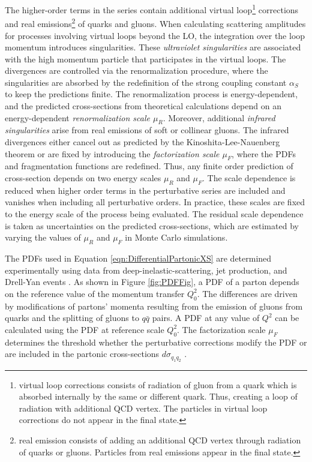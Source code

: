 The higher-order terms in the series contain additional virtual loop\footnote{virtual loop corrections consists of radiation of gluon from a quark which is absorbed internally by the same or different quark. Thus, creating a loop of radiation with additional QCD vertex. The particles in virtual loop corrections do not appear in the final state.} corrections and real emissions\footnote{real emission consists of adding an additional QCD vertex through radiation of quarks or gluons. Particles from real emissions appear in the final state.} of quarks and gluons. When calculating scattering amplitudes for processes involving virtual loops beyond the LO, the integration over the loop momentum introduces singularities. These \textit{ultraviolet singularities} are associated with the high momentum particle that participates in the virtual loops. The divergences are controlled via the renormalization procedure, where the singularities are absorbed by the redefinition of the strong coupling constant $\alpha_S$ to keep the predictions finite. The renormalization process is energy-dependent, and the predicted cross-sections from theoretical calculations depend on an energy-dependent \textit{renormalization scale $\mu_{R}$}. Moreover, additional \textit{infrared singularities} arise from real emissions of soft or collinear gluons. The infrared divergences either cancel out as predicted by the Kinoshita-Lee-Nauenberg theorem \cite{SoftCollinear} or are fixed by introducing the \textit{factorization scale $\mu_{F}$}, where the PDFs and fragmentation functions are redefined. Thus, any finite order prediction of cross-section depends on two energy scales $\mu_{R}$ and $\mu_{F}$. The scale dependence is reduced when higher order terms in the perturbative series are included and vanishes when including all perturbative orders. In practice, these scales are fixed to the energy scale of the process being evaluated. The residual scale dependence is taken as uncertainties on the predicted cross-sections, which are estimated by varying the values of $\mu_{R}$ and $\mu_{F}$ in Monte Carlo simulations.

The PDFs used in Equation \ref{eqn:DifferentialPartonicXS} are determined experimentally using data from deep-inelastic-scattering, jet production, and Drell-Yan events \cite{FixedTargetDrellYan} \cite{PDF4LHC}. As shown in Figure \ref{fig:PDFFig}, a PDF of a parton depends on the reference value of the momentum transfer $Q_{0}^2$. The differences are driven by modifications of partons' momenta resulting from the emission of gluons from quarks and the splitting of gluons to $q\bar{q}$ pairs. A PDF at any value of $Q^2$ can be calculated using the PDF at reference scale $Q_{0}^2$. The factorization scale $\mu_{F}$ determines the threshold whether the perturbative corrections modify the PDF or are included in the partonic cross-sections $d\sigma_{q_{1}q_{2}}$ \cite{QCDForCollider}.

